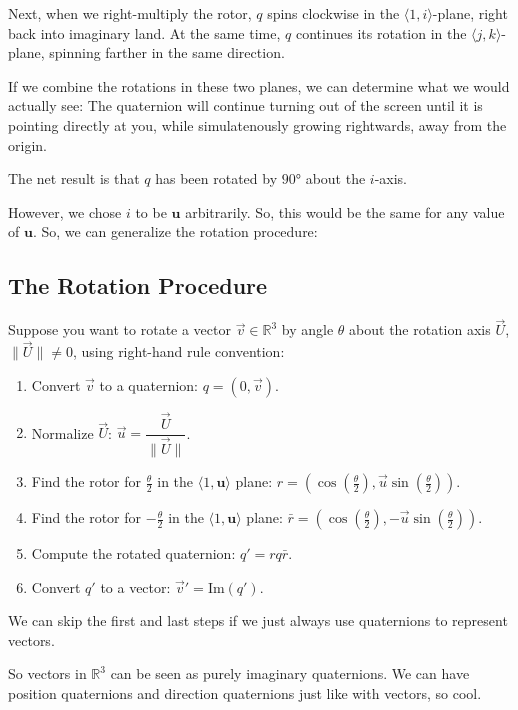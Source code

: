 \documentclass[12pt]{article}
\begin{document}
 	Next, when we right-multiply the rotor, $q$ spins clockwise in the $\langle 1, i \rangle$-plane, right back into imaginary land. 
 	At the same time, $q$ continues its rotation in the $\langle j, k \rangle$-plane, spinning farther in the same direction. 	
 	
 	If we combine the rotations in these two planes, we can determine what we would actually see: The quaternion will continue turning out of the screen until it is pointing directly at you, while simulatenously growing rightwards, away from the origin. 
 	
 	The net result is that $q$ has been rotated by $90 \si{\degree}$ about the $i$-axis.
 	
 	However, we chose $i$ to be $\mathbf{u}$ arbitrarily. So, this would be the same for any value of $\mathbf{u}$. So, we can generalize the rotation procedure:
 	
 	\subsection{The Rotation Procedure}
 	
 	Suppose you want to rotate a vector $\vec{v} \in \mathbb{R}^3$ by angle $\theta$ about the rotation axis $\vec{U}$, $\|\vec{U}\| \ne 0$, using right-hand rule convention:
 	
 	\begin{enumerate}
 		\item Convert $\vec{v}$ to a quaternion: $q = (0, \vec{v})$.
 		\item Normalize $\vec{U}$: $\vec{u} = \dfrac{\vec{U}}{\|\vec{U}\|}$.
 		\item Find the rotor for $\tfrac{\theta}{2}$ in the $\langle 1, \mathbf{u} \rangle$ plane: $r = (\cos\left(\tfrac{\theta}{2}\right), \vec{u}\sin\left(\tfrac{\theta}{2}\right))$.
 		\item Find the rotor for $-\tfrac{\theta}{2}$ in the $\langle 1, \mathbf{u} \rangle$ plane: $\bar{r} = (\cos\left(\tfrac{\theta}{2}\right), -\vec{u}\sin\left(\tfrac{\theta}{2}\right))$.
 		\item Compute the rotated quaternion: $q' = rq\bar{r}$.
 		\item Convert $q'$ to a vector: $\vec{v}' = \text{Im}(q')$.
	\end{enumerate}
 	
 	We can skip the first and last steps if we just always use quaternions to represent vectors.
 	
 	So vectors in $\mathbb{R}^3$ can be seen as purely imaginary quaternions.
 	We can have position quaternions and direction quaternions just like with vectors, so cool.
 	
\end{document}

